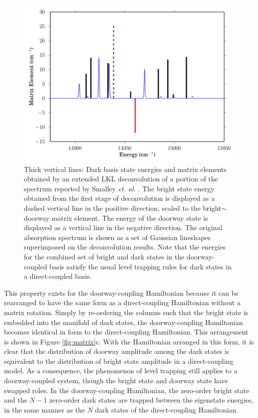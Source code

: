\begin{figure}
  \caption{Thick vertical lines: Dark basis state energies and matrix
    elements obtained by an extended LKL deconvolution of a portion of
    the  spectrum reported by Smalley \emph{et. al.}
    \cite{smalley75}.  The bright state energy obtained from the first
    stage of deconvolution is displayed as a dashed vertical line in
    the positive direction, scaled to the bright$\sim$doorway matrix
    element.  The energy of the doorway state is displayed as a
    vertical line in the negative direction.  The original absorption
    spectrum is shown as a set of Gaussian lineshapes superimposed on
    the deconvolution results.  Note that the energies for the
    combined set of bright and dark states in the doorway-coupled
    basis satisfy the usual level trapping rules for dark states in a
    direct-coupled basis.}
  \label{fig:smalley-doorway}
  \centering
  \includegraphics[width=6in]{smalley-doorway.png}
\end{figure}

This property exists for the doorway-coupling Hamiltonian because it
can be rearranged to have the same form as a direct-coupling
Hamiltonian without a matrix rotation.  Simply by re-ordering the
columns such that the bright state is embedded into the manifold of
dark states, the doorway-coupling Hamiltonian becomes identical in
form to the direct-coupling Hamiltonian.  This arrangement is shown in
Figure \ref{fig:matrix}c.  With the Hamiltonian arranged in this form,
it is clear that the distribution of doorway amplitude among the dark
states is equivalent to the distribution of bright state amplitude in
a direct-coupling model.  As a consequence, the phenomenon of level
trapping still applies to a doorway-coupled system, though the bright
state and doorway state have swapped roles.  In the doorway-coupling
Hamiltonian, the zero-order bright state and the $N-1$ zero-order dark
states are trapped between the eigenstate energies, in the same manner
as the $N$ dark states of the direct-coupling Hamiltonian.

